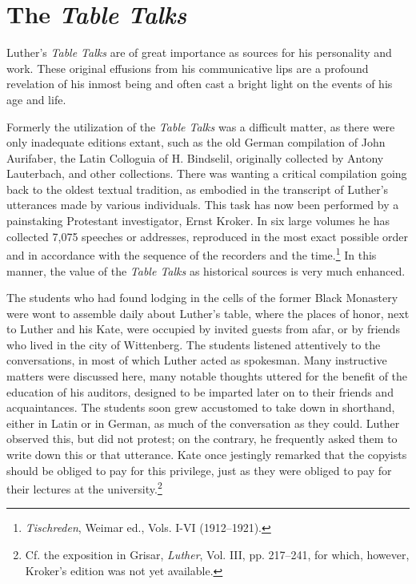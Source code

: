 \section{The \textit{Table Talks}}

Luther’s \textit{Table Talks} are of great importance as sources for his
personality and work. These original effusions from his communicative
lips are a profound revelation of his inmost being and often cast a
bright light on the events of his age and life.

Formerly the utilization of the \textit{Table Talks} was a difficult matter,
as there were only inadequate editions extant, such as the old German
compilation of John Aurifaber, the Latin Colloguia of H. Bindselil,
originally collected by Antony Lauterbach, and other collections.
There was wanting a critical compilation going back to the oldest
textual tradition, as embodied in the transcript of Luther’s utterances
made by various individuals. This task has now been performed by a
painstaking Protestant investigator, Ernst Kroker. In six large volumes
he has collected 7,075 speeches or addresses, reproduced in the
most exact possible order and in accordance with the sequence of the
recorders and the time.\footnote{\textit{Tischreden}, Weimar ed., Vols. I-VI (1912--1921).}
 In this manner, the value of the \textit{Table Talks}
as historical sources is very much enhanced.

The students who had found lodging in the cells of the former
Black Monastery were wont to assemble daily about Luther’s table,
where the places of honor, next to Luther and his Kate, were occupied
by invited guests from afar, or by friends who lived in the city
of Wittenberg. The students listened attentively to the conversations,
in most of which Luther acted as spokesman. Many instructive matters
were discussed here, many notable thoughts uttered for the benefit of
the education of his auditors, designed to be imparted later on to
their friends and acquaintances. The students soon grew accustomed
to take down in shorthand, either in Latin or in German, as much
of the conversation as they could. Luther observed this, but did not
protest; on the contrary, he frequently asked them to write down
this or that utterance. Kate once jestingly remarked that the copyists
should be obliged to pay for this privilege, just as they were obliged
to pay for their lectures at the university.\footnote
{Cf. the exposition in Grisar, \textit{Luther}, Vol. III, pp. 217--241, for which, however,
Kroker’s edition was not yet available.}

